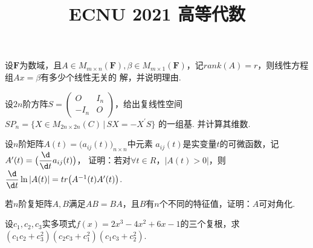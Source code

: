 \documentclass[windows]{BHCexam}
\begin{document}
	
	\title{ECNU 2021 高等代数}
	
	\maketitle
	
	\begin{groups}
        \begin{questions}[s]
            \question[15] 设$\mathbf{F}$为数域，且$A \in M_{m \times n}(\mathbf{F}),\beta \in 
            M_{m \times 1}(\mathbf{F})$，记$rank(A)=r$，则线性方程组$Ax=\beta$有多少个线性无关的
            解，并说明理由.
        \end{questions}

        \begin{questions}[s]
            \question[15] 
            设$2n$阶方阵$S=\begin{pmatrix}
                O & I_n \\
                -I_n & O
            \end{pmatrix}$，给出复线性空间$SP_n=\{ X \in M_{2n \times 2n} (C) \,|\, SX=-X^\prime S \}$
            的一组基. 并计算其维数.
        \end{questions}

        \begin{questions}[s]
            \question[15] 设$n$阶矩阵$A(t)=\bigl( a_{ij}(t) \bigr)_{n \times n}$中元素
            $a_{ij}(t)$是实变量$t$的可微函数，记$A^\prime(t) = \bigl( \dfrac{\d}{\d t} a_{ij}(t) \bigr)$，
            证明：若对$\forall t \in R$，$|A(t)>0|$，则$\dfrac{\d}{\d t} \ln |A(t)| = tr\bigl( A^{-1} (t) A^\prime(t) \bigr)$.
        \end{questions}

        \begin{questions}[s]
            \question[15]
            若$n$阶复矩阵$A,B$满足$AB=BA$，且$B$有$n$个不同的特征值，证明：$A$可对角化.
        \end{questions}

        \begin{questions}[s]
            \question[15]
            设$c_1,c_2,c_3$实多项式$f(x)=2x^3-4x^2+6x-1$的三个复根，求$(c_1c_2+c_3^2)(
                c_2c_3+c_1^2
            )(c_1c_3+c_2^2)$.
        \end{questions}


\end{groups}
\end{document}
